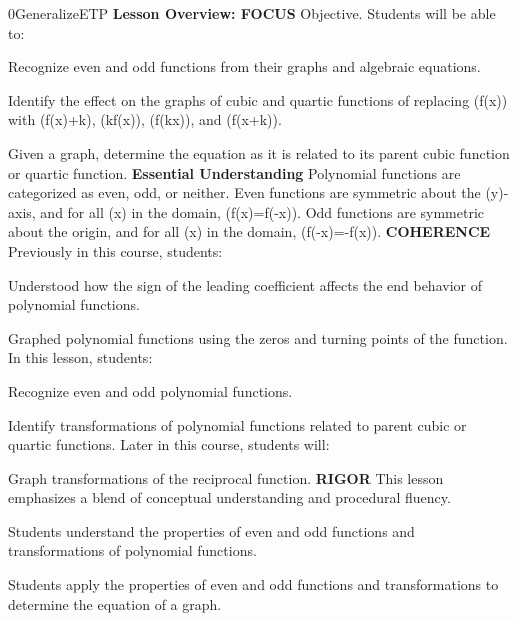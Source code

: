 \documentclass{article}
\newenvironment{te-addendum}[2]{}{}     %
\begin{document}
\begin{te-addendum}{0}{GeneralizeETP}
\textbf{Lesson Overview: FOCUS}
Objective. Students will be able to:
\item Recognize even and odd functions from their graphs and algebraic equations.
\item Identify the effect on the graphs of cubic and quartic functions of replacing (f(x)) with (f(x)+k), (kf(x)), (f(kx)), and (f(x+k)).
\item Given a graph, determine the equation as it is related to its parent cubic function or quartic function.
\textbf{Essential Understanding}
Polynomial functions are categorized as even, odd, or neither. Even functions are symmetric about the (y)-axis, and for all (x) in the domain, (f(x)=f(-x)). Odd functions are symmetric about the origin, and for all (x) in the domain, (f(-x)=-f(x)).
\textbf{COHERENCE}
Previously in this course, students:
\item Understood how the sign of the leading coefficient affects the end behavior of polynomial functions.
\item Graphed polynomial functions using the zeros and turning points of the function.
In this lesson, students:
\item Recognize even and odd polynomial functions.
\item Identify transformations of polynomial functions related to parent cubic or quartic functions.
Later in this course, students will:
\item Graph transformations of the reciprocal function.
\textbf{RIGOR}
This lesson emphasizes a blend of conceptual understanding and procedural fluency.
\item Students understand the properties of even and odd functions and transformations of polynomial functions.
\item Students apply the properties of even and odd functions and transformations to determine the equation of a graph.
\end{te-addendum}
\end{document}
